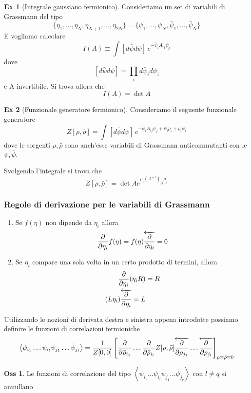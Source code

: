 \documentclass[10pt,a4paper]{article}
\theoremstyle{definition}
\newtheorem{observation}{Oss}[section]
\newtheorem{example}{Ex}[section]
\begin{document}
\begin{example}[Integrale gaussiano fermionico]
    Consideriamo un set di variabili di Grassmann del tipo
    \[
    \{\eta_1, \dots, \eta_N, \eta_{N + 1}, \dots, \eta_{2N}\} = \{\psi_1, \dots, \psi_N, \bar{\psi}_1, \dots, \bar{\psi}_N\}    
    \]
    E vogliamo calcolare
    \[
    I(A) \equiv \int [d\bar{\psi}d\psi]\, e^{-\bar{\psi}_i A_{ij}\psi_j}     
    \]
    dove 
    \[
        [d\bar{\psi}d\psi] = \prod_i d\bar{\psi}_i d\psi_i   
    \]
    e A invertibile. Si trova allora che
    \[
    I(A) = \det A    
    \]
\end{example}

\begin{example}[Funzionale generatore fermionico]
    Consideriamo il seguente funzionale generatore 
    \[
    Z[\rho, \bar{\rho}] = \int [d\bar{\psi}d\psi] \, e^{-\bar{\psi}_i A_{ij}\psi_j + \bar{\psi}_i \rho_i + \bar{\rho}_i \psi_i}    
    \]
    dove le sorgenti $\rho, \bar{\rho}$ sono anch'esse variabili di Grassmann anticommutanti con le $\psi, \bar{\psi}$.

    Svolgendo l'integrale si trova che
    \[
    Z[\rho, \bar{\rho}] = \det A e^{\bar{\rho}_i (A^{-1})_{ij}\rho_j}    
    \]
\end{example}  

\subsubsection{Regole di derivazione per le variabili di Grassmann}
\begin{enumerate}
    \item Se $f(\eta)$ non dipende da $\eta_i$ allora 
    \[
    \pdv{\eta_i}f(\eta) = f(\eta)\overleftarrow{\pdv{\eta_i}}=0    
    \]
    \item Se $\eta_i$ compare una sola volta in un certo prodotto di termini, allora 
    \begin{align*}
        \pdv{\eta_i}(\eta_i R) &= R \\
        (L \eta_i)\overleftarrow{\pdv{\eta_i}} = L 
    \end{align*}
\end{enumerate}
Utilizzando le nozioni di derivata destra e sinistra appena introdotte possiamo definire le funzioni di correlazioni fermioniche
\[
\left< \psi_{i_1} \dots \psi_{i_l} \bar{\psi}_{j_1} \dots \bar{\psi}_{j_l} \right> = \frac{1}{Z[0, 0]}\left[\pdv{\bar{\rho}_{i_1}} \dots \pdv{\bar{\rho}_{i_l}} Z[\rho, \bar{\rho}] \overleftarrow{\pdv{\rho_{j_1}}} \dots \overleftarrow{\pdv{\rho_{j_l}}}\right]_{\rho = \bar{\rho} = 0}  
\]
\begin{observation}
    Le funzioni di correlazione del tipo $\left< \psi_{i_1} \dots \psi_{i_l} \bar{\psi}_{j_1} \dots \bar{\psi}_{j_q} \right>$ con $l \neq q$ si annullano
\end{observation}
\end{document}
